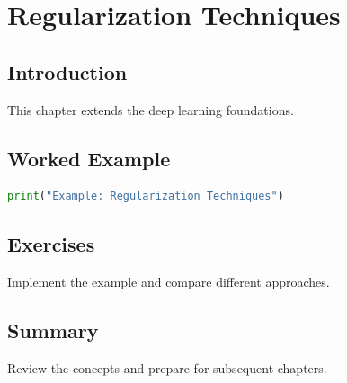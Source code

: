 \chapter{Regularization Techniques}
\label{chap:vol7-7}



\section{Introduction}
This chapter extends the deep learning foundations.

\section{Worked Example}
\begin{lstlisting}[language=Python]
print("Example: Regularization Techniques")
\end{lstlisting}

\section{Exercises}
\begin{exercise}
Implement the example and compare different approaches.
\end{exercise}

\section{Summary}
Review the concepts and prepare for subsequent chapters.

